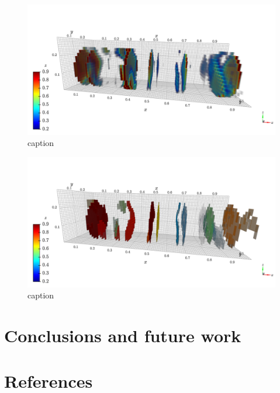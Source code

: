 \documentclass[12pt]{iopart}
\begin{document}
\begin{figure}[h!]
  \centering
    \includegraphics[width=\linewidth]{figures/3d_raw.png}
  \caption{caption}
  \label{fig:coffee}
\end{figure}

\begin{figure}[h!]
  \centering
    \includegraphics[width=\linewidth]{figures/3d_features.png}
  \caption{caption}
  \label{fig:coffee}
\end{figure}


\section{Conclusions and future work}

\section{References}
\end{document}
